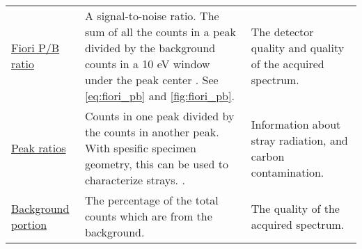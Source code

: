 \begin{table}[htp]
\begin{tabular}{p{2.5cm}p{8cm}p{4cm}}
        \hyperref[theory:eds_performance:fiori]{Fiori P/B ratio}                      & A signal-to-noise ratio. The sum of all the counts in a peak divided by the background counts in a 10 eV window under the peak center  \cite{fiori_peak_background_1982,williams_carter_tem_2009}. See \cref{eq:fiori_pb} and \cref{fig:fiori_pb}.          & The detector quality and quality of the acquired spectrum.         \\
        \hyperref[theory:eds_performance:peakratio]{Peak ratios}                      & Counts in one peak divided by the counts in another peak. With spesific specimen geometry, this can be used to characterize strays. \cite{egerton_nio_characterization_1994,ted_pella_nio_tem_2019}.                                                        & Information about stray radiation, and carbon contamination.       \\
        \hyperref[theory:eds_performance:background_portion]{Background portion}      & The percentage of the total counts which are from the background.                                                                                                                                                                                           & The quality of the acquired spectrum.                              \\
        \hline
    \end{tabular}
\end{table}